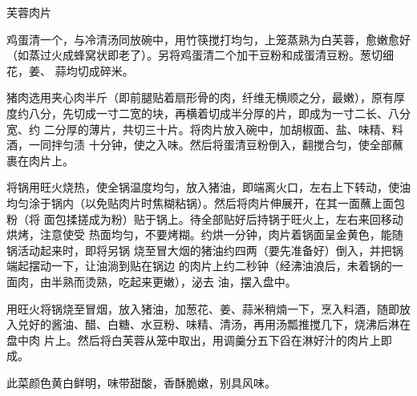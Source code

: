 \begin{recipe}{芙蓉肉片}

\ingredients


\preparation

\step 鸡蛋清一个，与冷清汤同放碗中，用竹筷搅打均匀，上笼蒸熟为白芙蓉，愈嫩愈好
（如蒸过火成蜂窝状即老了）。另将鸡蛋清二个加干豆粉和成蛋清豆粉。葱切细花，姜、
蒜均切成碎米。

\step 猪肉选用夹心肉半斤（即前腿贴着扇形骨的肉，纤维无横顺之分，最嫩），原有厚
度约八分，先切成一寸二宽的块，再横着切成半分厚的片，即成为一寸二长、八分宽、约
二分厚的薄片，共切三十片。将肉片放入碗中，加胡椒面、盐、味精、料酒，一同拌匀渍
十分钟，使之入味。然后将蛋清豆粉倒入，翻搅合匀，使全部蘸裹在肉片上。

\step 将锅用旺火烧热，使全锅温度均匀，放入猪油，即端离火口，左右上下转动，使油
均匀涂于锅内（以免贴肉片时焦糊粘锅）。然后将肉片伸展开，在其一面蘸上面包粉（将
面包揉搓成为粉）贴于锅上。待全部贴好后持锅于旺火上，左右来回移动烘烤，注意使受
热面均匀，不要烤糊。约烘一分钟，肉片着锅面呈金黄色，能随锅活动起来时，即将另锅
烧至冒大烟的猪油约四两（要先准备好）倒入，并把锅端起摆动一下，让油淌到贴在锅边
的肉片上约二秒钟（经沸油浪后，未着锅的一面肉，由半熟而烫熟，吃起来更嫩），泌去
油，摆入盘中。

\step 用旺火将锅烧至冒烟，放入猪油，加葱花、姜、蒜米稍煵一下，烹入料酒，随即放
入兑好的酱油、醋、白糖、水豆粉、味精、清汤，再用汤瓢推搅几下，烧沸后淋在盘中肉
片上。然后将白芙蓉从笼中取出，用调羹分五下舀在淋好汁的肉片上即成。

\features

此菜颜色黄白鲜明，味带甜酸，香酥脆嫩，别具风味。

\end{recipe}

